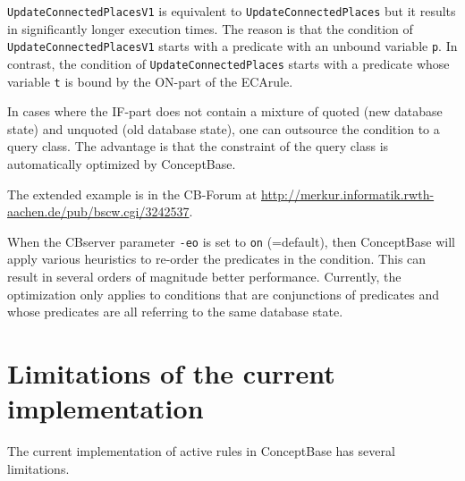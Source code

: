 {\tt UpdateConnectedPlacesV1} is equivalent to {\tt UpdateConnectedPlaces} but it results in
significantly longer execution times. The reason is that the condition of
{\tt UpdateConnectedPlacesV1} starts with a predicate with an unbound variable {\tt p}.
In contrast, the condition of {\tt Update\-Connected\-Places} starts with a predicate whose
variable {\tt t} is bound by the ON-part of the ECArule.

In cases where the IF-part does not contain a mixture of quoted (new database state) and
unquoted (old database state), one can outsource the condition to a query class.
The advantage is that the constraint of the query class is automatically optimized
by ConceptBase. 

The extended example is in the CB-Forum at
\url{http://merkur.informatik.rwth-aachen.de/pub/bscw.cgi/3242537}.


When the CBserver parameter {\tt -eo}  is set to {\tt on} (=default), then ConceptBase will
apply various heuristics to re-order the predicates in the condition. This
can result in several orders of magnitude better performance.
Currently, the optimization only applies to conditions that are
conjunctions of predicates and whose predicates are all referring to the 
same database state.



\section{Limitations of the current implementation}

The current implementation of active rules in ConceptBase has several limitations.

